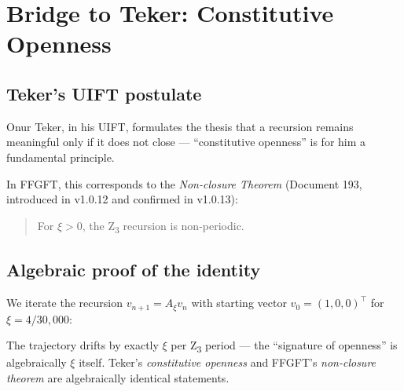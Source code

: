\section{Bridge to Teker: Constitutive Openness}
\label{sec:tekermen}

\subsection{Teker's UIFT postulate}

Onur Teker, in his UIFT, formulates the thesis that a recursion remains meaningful only if it does not close --- ``constitutive openness'' is for him a fundamental principle.

In FFGFT, this corresponds to the \emph{Non-closure Theorem} (Document 193, introduced in v1.0.12 and confirmed in v1.0.13):
\begin{quote}
For \(\xi > 0\), the Z\textsubscript{3} recursion is non-periodic.
\end{quote}

\subsection{Algebraic proof of the identity}

We iterate the recursion \(v_{n+1} = A_\xi v_n\) with starting vector \(v_0 = (1, 0, 0)^\top\) for \(\xi = 4/30{,}000\):

\begin{table}[h]
\centering
\caption{Trajectories of the Z\textsubscript{3} recursion: unperturbed vs.~perturbed}
\end{table}

\begin{keyresult}
The trajectory drifts by exactly \(\xi\) per Z\textsubscript{3} period --- the ``signature of openness'' is algebraically \(\xi\) itself. Teker's \emph{constitutive openness} and FFGFT's \emph{non-closure theorem} are algebraically identical statements.
\end{keyresult}

